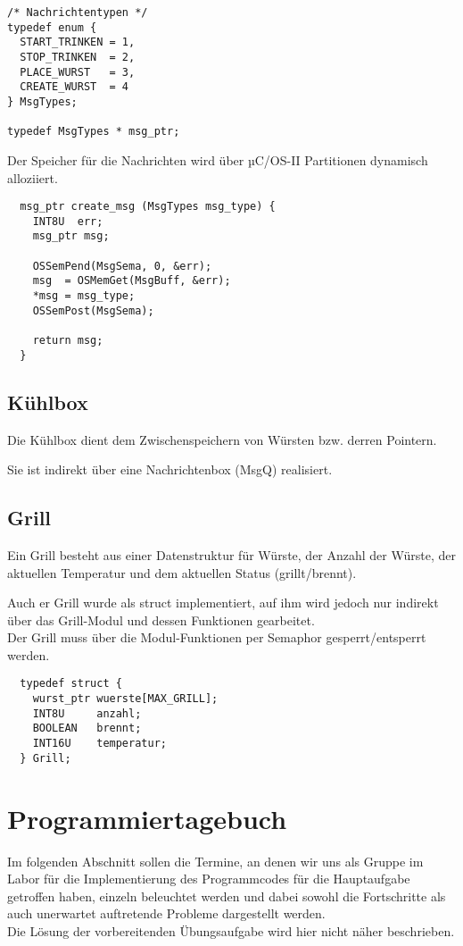 \begin{lstlisting}
/* Nachrichtentypen */
typedef enum {
  START_TRINKEN = 1,
  STOP_TRINKEN  = 2,
  PLACE_WURST   = 3,
  CREATE_WURST  = 4
} MsgTypes;

typedef MsgTypes * msg_ptr;
\end{lstlisting}

Der Speicher für die Nachrichten wird über µC/OS-II Partitionen dynamisch alloziiert.

\begin{lstlisting}
  msg_ptr create_msg (MsgTypes msg_type) {
    INT8U  err;
    msg_ptr msg;

    OSSemPend(MsgSema, 0, &err);
    msg  = OSMemGet(MsgBuff, &err);
    *msg = msg_type;
    OSSemPost(MsgSema);

    return msg;
  }
\end{lstlisting}

\subsection{Kühlbox}

Die Kühlbox dient dem Zwischenspeichern von Würsten bzw. derren Pointern.

Sie ist indirekt über eine Nachrichtenbox (MsgQ) realisiert.

\subsection{Grill}

Ein Grill besteht aus einer Datenstruktur für Würste, der Anzahl der Würste, der aktuellen Temperatur und dem aktuellen Status (grillt/brennt).

Auch er Grill wurde als struct implementiert, auf ihm wird jedoch nur indirekt über das Grill-Modul und dessen Funktionen gearbeitet.\\
Der Grill muss über die Modul-Funktionen per Semaphor gesperrt/entsperrt werden.

\begin{lstlisting}
  typedef struct {
    wurst_ptr wuerste[MAX_GRILL];
    INT8U     anzahl;
    BOOLEAN   brennt;
    INT16U    temperatur;
  } Grill;
\end{lstlisting}

\section{Programmiertagebuch}

Im folgenden Abschnitt sollen die Termine, an denen wir uns als Gruppe im Labor für die Implementierung des Programmcodes für die Hauptaufgabe getroffen haben, einzeln beleuchtet werden und dabei sowohl die Fortschritte als auch unerwartet auftretende Probleme dargestellt werden.\\
Die Lösung der vorbereitenden Übungsaufgabe wird hier nicht näher beschrieben.

